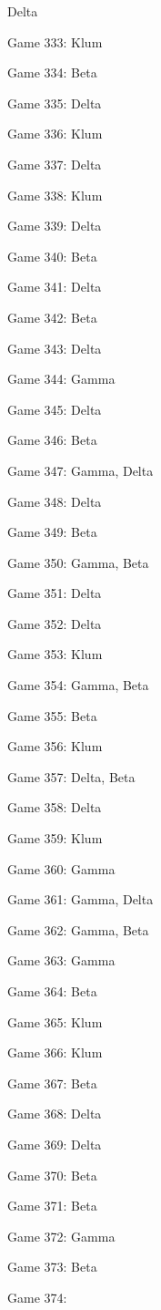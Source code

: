 \documentclass{article}
\begin{document}
\begin{multicols}{3}
\begin{compactitem}
Delta
\item Game 333:
Klum
\item Game 334:
Beta
\item Game 335:
Delta
\item Game 336:
Klum
\item Game 337:
Delta
\item Game 338:
Klum
\item Game 339:
Delta
\item Game 340:
Beta
\item Game 341:
Delta
\item Game 342:
Beta
\item Game 343:
Delta
\item Game 344:
Gamma
\item Game 345:
Delta
\item Game 346:
Beta
\item Game 347:
Gamma, Delta
\item Game 348:
Delta
\item Game 349:
Beta
\item Game 350:
Gamma, Beta
\item Game 351:
Delta
\item Game 352:
Delta
\item Game 353:
Klum
\item Game 354:
Gamma, Beta
\item Game 355:
Beta
\item Game 356:
Klum
\item Game 357:
Delta, Beta
\item Game 358:
Delta
\item Game 359:
Klum
\item Game 360:
Gamma
\item Game 361:
Gamma, Delta
\item Game 362:
Gamma, Beta
\item Game 363:
Gamma
\item Game 364:
Beta
\item Game 365:
Klum
\item Game 366:
Klum
\item Game 367:
Beta
\item Game 368:
Delta
\item Game 369:
Delta
\item Game 370:
Beta
\item Game 371:
Beta
\item Game 372:
Gamma
\item Game 373:
Beta
\item Game 374:

\end{compactitem}
\end{multicols}
\end{document}
